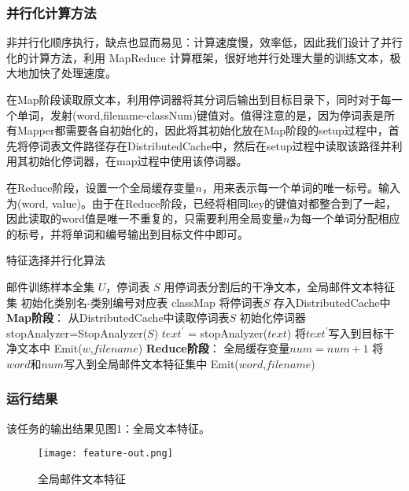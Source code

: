 \documentclass[lang=cn,11pt]{elegantpaper}
\begin{document}
\subsubsection{并行化计算方法}
非并行化顺序执行，缺点也显而易见：计算速度慢，效率低，因此我们设计了并行化的计算方法，利用 MapReduce 计算框架，很好地并行处理大量的训练文本，极大地加快了处理速度。\par
在Map阶段读取原文本，利用停词器将其分词后输出到目标目录下，同时对于每一个单词，发射(word,filename-classNum)键值对。值得注意的是，因为停词表是所有Mapper都需要各自初始化的，因此将其初始化放在Map阶段的setup过程中，首先将停词表文件路径存在DistributedCache中，然后在setup过程中读取该路径并利用其初始化停词器，在map过程中使用该停词器。\par
在Reduce阶段，设置一个全局缓存变量$n$，用来表示每一个单词的唯一标号。输入为(word, value)。由于在Reduce阶段，已经将相同key的键值对都整合到了一起，因此读取的word值是唯一不重复的，只需要利用全局变量$n$为每一个单词分配相应的标号，并将单词和编号输出到目标文件中即可。\par
\begin{algorithm}[!htb]  
  \caption{特征选择并行化算法}  
  \label{alg:Framwork}
  \begin{algorithmic}[1]
    \Require
    邮件训练样本全集 $U$，停词表 $S$
    \Ensure 
    用停词表分割后的干净文本，全局邮件文本特征集
    \State 初始化类别名-类别编号对应表 classMap
    \State 将停词表$S$ 存入DistributedCache中
    \State \textbf{Map阶段}：
    \State 从DistributedCache中读取停词表$S$
    \State 初始化停词器 stopAnalyzer=StopAnalyzer($S$)
    \EndFunction
      \State $text^\prime$ = stopAnalyzer($text$)
      \State 将$text^\prime$写入到目标干净文本中
        \State Emit($w$,$filename$)
      \EndFor
    \EndFunction
    \State \textbf{Reduce阶段}：
      \State 全局缓存变量$num=num+1$
      \State 将$word$和$num$写入到全局邮件文本特征集中
      \State Emit($word$,$filename$)
    \EndFunction
  \end{algorithmic}
\end{algorithm}

\subsubsection{运行结果}
该任务的输出结果见图1：全局文本特征。
\begin{figure}[!htb]
	\centering
	\texttt{[image: feature-out.png]}
	\caption{全局邮件文本特征 \label{fig:feature-out}}
\end{figure}
\end{document}

